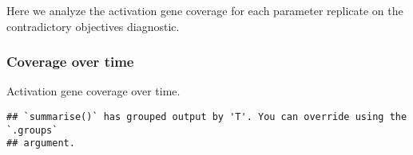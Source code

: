 \documentclass[]{book}
\newenvironment{Shaded}{\begin{snugshade}}{\end{snugshade}}
\newcommand{\DataTypeTok}[1]{\textcolor[rgb]{0.13,0.29,0.53}{#1}}
\newcommand{\KeywordTok}[1]{\textcolor[rgb]{0.13,0.29,0.53}{\textbf{#1}}}
\newcommand{\NormalTok}[1]{#1}
\newcommand{\OperatorTok}[1]{\textcolor[rgb]{0.81,0.36,0.00}{\textbf{#1}}}
\newcommand{\StringTok}[1]{\textcolor[rgb]{0.31,0.60,0.02}{#1}}
\begin{document}
Here we analyze the activation gene coverage for each parameter replicate on the contradictory objectives diagnostic.

\hypertarget{coverage-over-time-6}{%
\subsubsection{Coverage over time}\label{coverage-over-time-6}}

Activation gene coverage over time.

\begin{Shaded}
\end{Shaded}

\begin{verbatim}
## `summarise()` has grouped output by 'T'. You can override using the `.groups`
## argument.
\end{verbatim}
\end{document}
